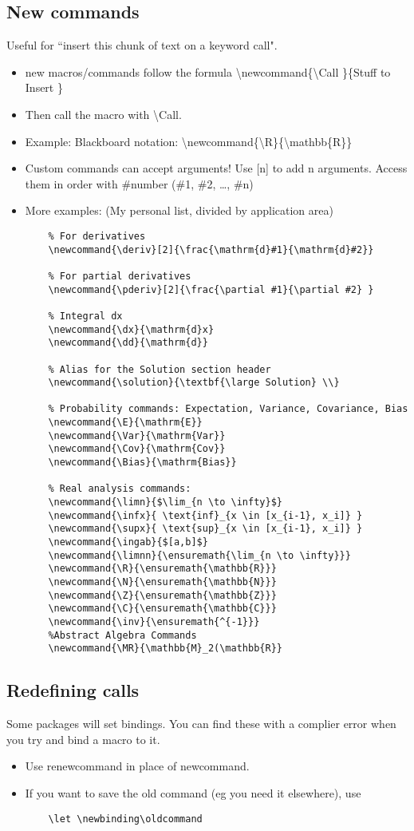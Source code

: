 \documentclass[11pt]{article}
\begin{document}
\subsection{New commands}
Useful for ``insert this chunk of text on a keyword call". 
\begin{itemize}
	\item new macros/commands follow the formula  \textbackslash newcommand\{\textbackslash Call \}\{Stuff to Insert \}
	\item Then call the macro with \textbackslash Call.
	\item Example: Blackboard notation: \textbackslash newcommand\{\textbackslash R\}\{\textbackslash mathbb\{R\}\}
	\item Custom commands can accept arguments! Use [n] to add n arguments. Access them in order with \#number (\#1, \#2, \ldots, \#n)
	\item More examples: (My personal list, divided by application area)
	\begin{verbatim}
	% For derivatives
	\newcommand{\deriv}[2]{\frac{\mathrm{d}#1}{\mathrm{d}#2}}
	
	% For partial derivatives
	\newcommand{\pderiv}[2]{\frac{\partial #1}{\partial #2} }
	
	% Integral dx
	\newcommand{\dx}{\mathrm{d}x}
	\newcommand{\dd}{\mathrm{d}}
	
	% Alias for the Solution section header
	\newcommand{\solution}{\textbf{\large Solution} \\}

	% Probability commands: Expectation, Variance, Covariance, Bias
	\newcommand{\E}{\mathrm{E}}
	\newcommand{\Var}{\mathrm{Var}}
	\newcommand{\Cov}{\mathrm{Cov}}
	\newcommand{\Bias}{\mathrm{Bias}}
	
	% Real analysis commands: 
	\newcommand{\limn}{$\lim_{n \to \infty}$}
	\newcommand{\infx}{ \text{inf}_{x \in [x_{i-1}, x_i]} }
	\newcommand{\supx}{ \text{sup}_{x \in [x_{i-1}, x_i]} }
	\newcommand{\ingab}{$[a,b]$}
	\newcommand{\limnn}{\ensuremath{\lim_{n \to \infty}}}
	\newcommand{\R}{\ensuremath{\mathbb{R}}}
	\newcommand{\N}{\ensuremath{\mathbb{N}}}
	\newcommand{\Z}{\ensuremath{\mathbb{Z}}}
	\newcommand{\C}{\ensuremath{\mathbb{C}}}
	\newcommand{\inv}{\ensuremath{^{-1}}}
	%Abstract Algebra Commands
	\newcommand{\MR}{\mathbb{M}_2(\mathbb{R}}
	\end{verbatim}
\end{itemize}
\subsection{Redefining calls}
Some packages will set bindings. You can find these with a complier error when you try and bind a macro to it.
\begin{itemize}
	\item Use renewcommand in place of newcommand. 
	\item If you want to save the old command (eg you need it elsewhere), use 
	\begin{verbatim}
	\let \newbinding\oldcommand
	\end{verbatim}
\end{itemize}
\end{document}
